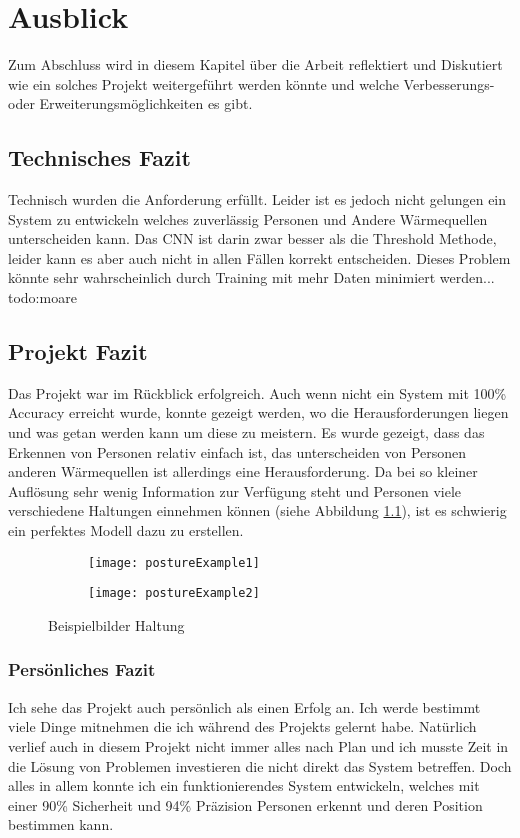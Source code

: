 \chapter{Ausblick}
\label{ch:Ausblick}

Zum Abschluss wird in diesem Kapitel über die Arbeit reflektiert und Diskutiert wie ein solches Projekt weitergeführt werden könnte und welche Verbesserungs- oder Erweiterungsmöglichkeiten es gibt.

\section{Technisches Fazit}

Technisch wurden die Anforderung erfüllt. Leider ist es jedoch nicht gelungen ein System zu entwickeln welches zuverlässig Personen und Andere Wärmequellen unterscheiden kann. Das \gls{CNN} ist darin zwar besser als die Threshold Methode, leider kann es aber auch nicht in allen Fällen korrekt entscheiden. Dieses Problem könnte sehr wahrscheinlich durch Training mit mehr Daten minimiert werden... todo:moare

\section{Projekt Fazit}

Das Projekt war im Rückblick erfolgreich. Auch wenn nicht ein System mit 100\% Accuracy erreicht wurde, konnte gezeigt werden, wo die Herausforderungen liegen und was getan werden kann um diese zu meistern. Es wurde gezeigt, dass das Erkennen von Personen relativ einfach ist, das unterscheiden von Personen anderen Wärmequellen ist allerdings eine Herausforderung. Da bei so kleiner Auflösung sehr wenig Information zur Verfügung steht und Personen viele verschiedene Haltungen einnehmen können (siehe Abbildung \ref{fig:postureExample}), ist es schwierig ein perfektes Modell dazu zu erstellen.

\begin{figure}[H]
	\centering
	\begin{subfigure}{.4\linewidth}
		\centering
		\texttt{[image: postureExample1]}
	\end{subfigure}
	\begin{subfigure}{.4\linewidth}
		\centering
		\texttt{[image: postureExample2]}
	\end{subfigure}	
	\caption{Beispielbilder Haltung}
	\label{fig:postureExample}
\end{figure}

\subsection{Persönliches Fazit}

Ich sehe das Projekt auch persönlich als einen Erfolg an. Ich werde bestimmt viele Dinge mitnehmen die ich während des Projekts gelernt habe. Natürlich verlief auch in diesem Projekt nicht immer alles nach Plan und ich musste Zeit in die Lösung von Problemen investieren die nicht direkt das System betreffen. Doch alles in allem konnte ich ein funktionierendes System entwickeln, welches mit einer 90\% Sicherheit und 94\% Präzision Personen erkennt und deren Position bestimmen kann.